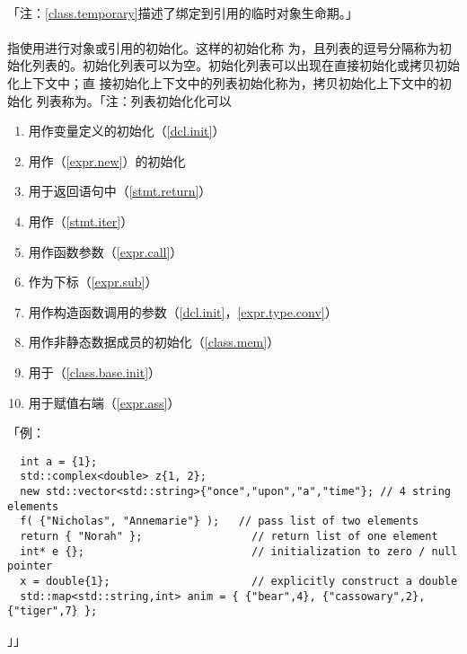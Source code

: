 \paragraph{}
「注：\ref{class.temporary}描述了绑定到引用的临时对象生命期。」

\paragraph{}
指使用进行对象或引用的初始化。这样的初始化称
为，且列表的逗号分隔称为初始化列表的。初始化列表可以为空。初始化列表可以出现在直接初始化或拷贝初始化上下文中；直
接初始化上下文中的列表初始化称为，拷贝初始化上下文中的初始化
列表称为。「注：列表初始化化可以
\begin{enumerate}
  \item{用作变量定义的初始化（\ref{dcl.init}）}
  \item{用作（\ref{expr.new}）的初始化}
  \item{用于返回语句中（\ref{stmt.return}）}
  \item{用作（\ref{stmt.iter}）}
  \item{用作函数参数（\ref{expr.call}）}
  \item{作为下标（\ref{expr.sub}）}
  \item{用作构造函数调用的参数（\ref{dcl.init}，\ref{expr.type.conv}）}
  \item{用作非静态数据成员的初始化（\ref{class.mem}）}
  \item{用于（\ref{class.base.init}）}
  \item{用于赋值右端（\ref{expr.ass}）}
\end{enumerate}
「例：
\begin{lstlisting}
  int a = {1};
  std::complex<double> z{1, 2};
  new std::vector<std::string>{"once","upon","a","time"}; // 4 string elements
  f( {"Nicholas", "Annemarie"} );   // pass list of two elements
  return { "Norah" };                 // return list of one element
  int* e {};                          // initialization to zero / null pointer
  x = double{1};                      // explicitly construct a double
  std::map<std::string,int> anim = { {"bear",4}, {"cassowary",2}, {"tiger",7} };
\end{lstlisting}」」

